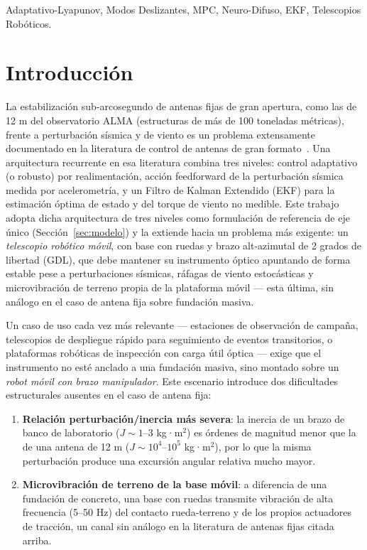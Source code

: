 \documentclass[journal]{IEEEtran}
\begin{document}
\begin{IEEEkeywords}
Adaptativo-Lyapunov, Modos Deslizantes, MPC, Neuro-Difuso, EKF,
Telescopios Robóticos.
\end{IEEEkeywords}

\section{Introducción}

La estabilización sub-arcosegundo de antenas fijas de gran apertura,
como las de 12 m del observatorio ALMA (estructuras de más de 100
toneladas métricas), frente a perturbación sísmica y de viento es un
problema extensamente documentado en la literatura de control de
antenas de gran formato~\cite{gawronski2008modeling,gawronski2001pi,qiu2014practical,mangum2006evaluation}.
Una arquitectura recurrente en esa literatura combina tres niveles:
control adaptativo (o robusto) por realimentación, acción feedforward de
la perturbación sísmica medida por acelerometría, y un Filtro de Kalman
Extendido (EKF) para la estimación óptima de estado y del torque de
viento no medible. Este trabajo adopta dicha arquitectura de tres niveles
como formulación de referencia de eje único (Sección~\ref{sec:modelo}) y
la extiende hacia un problema más exigente: un \emph{telescopio robótico
móvil}, con base con ruedas y brazo alt-azimutal de 2 grados de libertad
(GDL), que debe mantener su instrumento óptico apuntando de forma estable
pese a perturbaciones sísmicas, ráfagas de viento estocásticas y
microvibración de terreno propia de la plataforma móvil --- esta última,
sin análogo en el caso de antena fija sobre fundación masiva.

Un caso de uso cada vez más relevante --- estaciones de observación de
campaña, telescopios de despliegue rápido para seguimiento de eventos
transitorios, o plataformas robóticas de inspección con carga útil óptica
--- exige que el instrumento no esté anclado a una fundación masiva, sino
montado sobre un \emph{robot móvil con brazo manipulador}. Este escenario
introduce dos dificultades estructurales ausentes en el caso de antena
fija:

\begingroup
\setlength{\itemsep}{0pt}\setlength{\topsep}{2pt}\setlength{\parskip}{0pt}
\begin{enumerate}
  \item \textbf{Relación perturbación/inercia más severa}: la inercia de
  un brazo de banco de laboratorio ($J\sim 1$--$3$ kg·m$^2$) es órdenes de
  magnitud menor que la de una antena de 12 m ($J\sim 10^4$--$10^5$
  kg·m$^2$), por lo que la misma perturbación produce una excursión
  angular relativa mucho mayor.
  \item \textbf{Microvibración de terreno de la base móvil}: a diferencia
  de una fundación de concreto, una base con ruedas transmite vibración de
  alta frecuencia (5--50 Hz) del contacto rueda-terreno y de los propios
  actuadores de tracción, un canal sin análogo en la literatura de
  antenas fijas citada arriba.
\end{enumerate}
\endgroup
\end{document}
